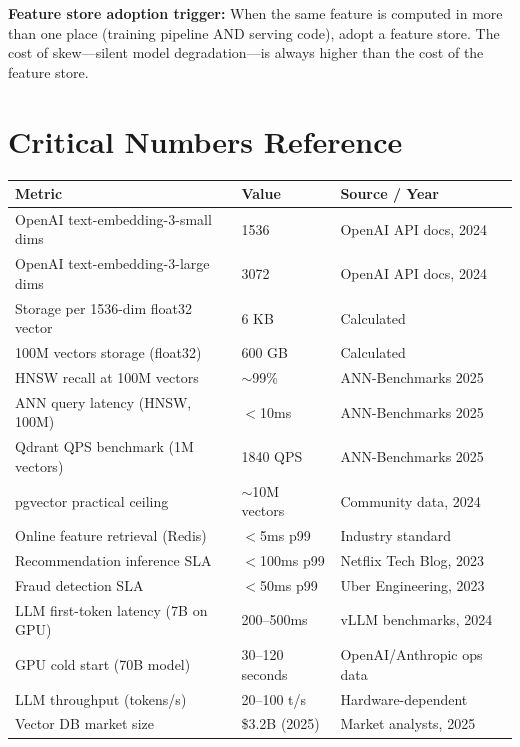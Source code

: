 \documentclass[11pt,a4paper]{article}
\begin{document}
\textbf{Feature store adoption trigger:} When the same feature is computed in more than one place (training pipeline AND serving code), adopt a feature store. The cost of skew---silent model degradation---is always higher than the cost of the feature store.

\section{Critical Numbers Reference}

\begin{center}
\begin{tabular}{p{5cm}p{3cm}p{5cm}}
\toprule
\textbf{Metric} & \textbf{Value} & \textbf{Source / Year} \\
\midrule
OpenAI text-embedding-3-small dims & 1536 & OpenAI API docs, 2024 \\
OpenAI text-embedding-3-large dims & 3072 & OpenAI API docs, 2024 \\
Storage per 1536-dim float32 vector & 6 KB & Calculated \\
100M vectors storage (float32) & 600 GB & Calculated \\
HNSW recall at 100M vectors & $\sim$99\% & ANN-Benchmarks 2025 \\
ANN query latency (HNSW, 100M) & $<$10ms & ANN-Benchmarks 2025 \\
Qdrant QPS benchmark (1M vectors) & 1840 QPS & ANN-Benchmarks 2025 \\
pgvector practical ceiling & $\sim$10M vectors & Community data, 2024 \\
Online feature retrieval (Redis) & $<$5ms p99 & Industry standard \\
Recommendation inference SLA & $<$100ms p99 & Netflix Tech Blog, 2023 \\
Fraud detection SLA & $<$50ms p99 & Uber Engineering, 2023 \\
LLM first-token latency (7B on GPU) & 200--500ms & vLLM benchmarks, 2024 \\
GPU cold start (70B model) & 30--120 seconds & OpenAI/Anthropic ops data \\
LLM throughput (tokens/s) & 20--100 t/s & Hardware-dependent \\
Vector DB market size & \$3.2B (2025) & Market analysts, 2025 \\
\bottomrule
\end{tabular}
\end{center}

\end{document}
